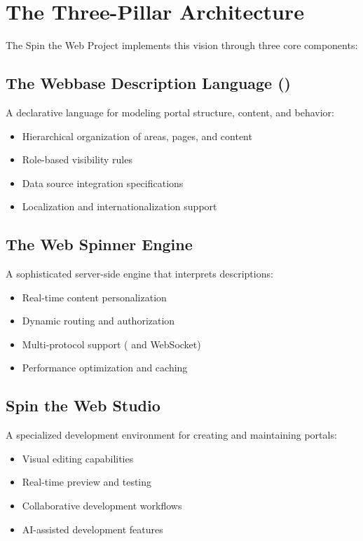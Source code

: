 \section{The Three-Pillar Architecture}
\label{sec:three-pillars}

The Spin the Web Project implements this vision through three core components:

\subsection{The Webbase Description Language (\wbdl{})}
A declarative language for modeling portal structure, content, and behavior:
\begin{itemize}
\item Hierarchical organization of areas, pages, and content
\item Role-based visibility rules
\item Data source integration specifications
\item Localization and internationalization support
\end{itemize}

\subsection{The Web Spinner Engine}
A sophisticated server-side engine that interprets \wbdl{} descriptions:
\begin{itemize}
\item Real-time content personalization
\item Dynamic routing and authorization
\item Multi-protocol support (\http{} and WebSocket)
\item Performance optimization and caching
\end{itemize}

\subsection{Spin the Web Studio}
A specialized development environment for creating and maintaining portals:
\begin{itemize}
\item Visual \wbdl{} editing capabilities
\item Real-time preview and testing
\item Collaborative development workflows
\item AI-assisted development features
\end{itemize}


